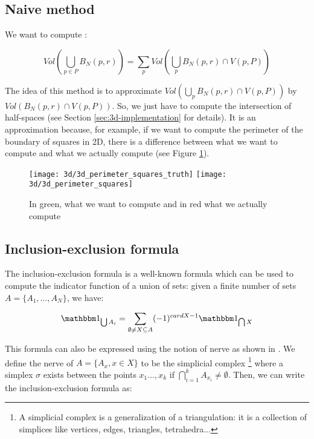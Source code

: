 \subsection{Naive method}
We want to compute :

\begin{equation}
    Vol(\bigcup_{p \in P} B_N(p, r)) = \sum_p Vol(\bigcup_p B_N(p, r) \cap V(p, P))
\end{equation}

The idea of this method is to approximate $ Vol(\bigcup_p B_N(p, r) \cap V(p,
P)) $ by $ Vol(B_N(p, r) \cap V(p, P)) $. So, we just have to compute the
intersection of half-spaces (see Section \ref{sec:3d-implementation} for
details). It is an approximation because, for example, if we want to compute the
perimeter of the boundary of squares in 2D, there is a difference between what
we want to compute and what we actually compute (see Figure
\ref{fig:3d-inclusion-exclusion-squares}).

\begin{figure}[h]
    \centering

    \texttt{[image: 3d/3d\_perimeter\_squares\_truth]}
    \hspace{2cm}
    \texttt{[image: 3d/3d\_perimeter\_squares]}
    \caption{In green, what we want to compute and in red what we actually compute}
    \label{fig:3d-inclusion-exclusion-squares}
\end{figure}

\subsection{Inclusion-exclusion formula}

The inclusion-exclusion formula is a well-known formula which can be used to
compute the indicator function of a union of sets: given a finite number of sets
$ A = \{ A_1, \ldots, A_N \} $, we have:

\begin{equation}
    \indicator{\bigcup A_i} = \sum_{\emptyset \neq X \subseteq A} (-1)^{card X -
        1} \indicator{\bigcap X}
\end{equation}

This formula can also be expressed using the notion of nerve as shown in
\cite{attali2007inclusion}. We define the nerve of $ A = \{ A_x, x \in X \} $ to
be the simplicial complex \footnote{A simplicial complex is a generalization of
    a triangulation: it is a collection of simplices like vertices, edges,
    triangles, tetrahedra...} where a simplex $ \sigma $ exists between the
points $ x_1 \ldots, x_k $ if $ \bigcap\limits_{i=1}^k A_{x_i} \neq \emptyset $.
Then, we can write the inclusion-exclusion formula as:

